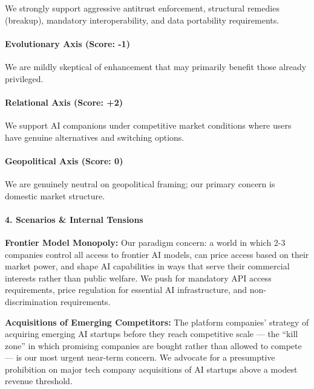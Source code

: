 We strongly support aggressive antitrust enforcement, structural
remedies (breakup), mandatory interoperability, and data portability
requirements.

\paragraph{Evolutionary Axis (Score:
-1)}\label{evolutionary-axis-score--1-4}

We are mildly skeptical of enhancement that may primarily benefit those
already privileged.

\paragraph{Relational Axis (Score: +2)}\label{relational-axis-score-2-6}

We support AI companions under competitive market conditions where users
have genuine alternatives and switching options.

\paragraph{Geopolitical Axis (Score:
0)}\label{geopolitical-axis-score-0-1}

We are genuinely neutral on geopolitical framing; our primary concern is
domestic market structure.

\paragraph{4. Scenarios \& Internal
Tensions}\label{scenarios-internal-tensions-28}

\textbf{Frontier Model Monopoly:} Our paradigm concern: a world in which
2-3 companies control all access to frontier AI models, can price access
based on their market power, and shape AI capabilities in ways that
serve their commercial interests rather than public welfare. We push for
mandatory API access requirements, price regulation for essential AI
infrastructure, and non-discrimination requirements.

\textbf{Acquisitions of Emerging Competitors:} The platform companies'
strategy of acquiring emerging AI startups before they reach competitive
scale --- the ``kill zone'' in which promising companies are bought
rather than allowed to compete --- is our most urgent near-term concern.
We advocate for a presumptive prohibition on major tech company
acquisitions of AI startups above a modest revenue threshold.

